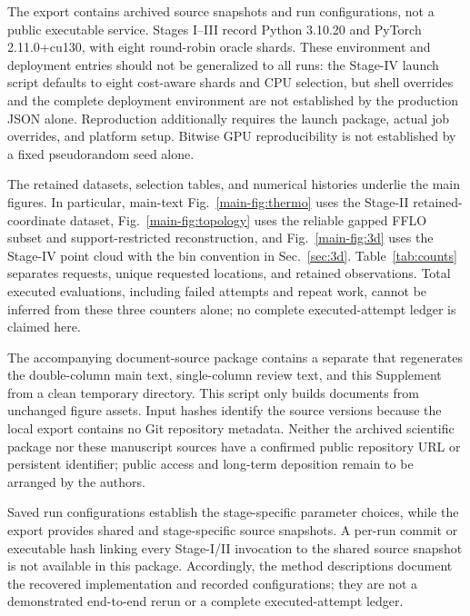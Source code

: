 The export contains archived source snapshots and run configurations, not a public executable service. Stages I--III record Python 3.10.20 and PyTorch 2.11.0+cu130, with eight round-robin oracle shards. These environment and deployment entries should not be generalized to all runs: the Stage-IV launch script defaults to eight cost-aware shards and CPU selection, but shell overrides and the complete deployment environment are not established by the production JSON alone. Reproduction additionally requires the launch package, actual job overrides, and platform setup. Bitwise GPU reproducibility is not established by a fixed pseudorandom seed alone.

The retained datasets, selection tables, and numerical histories underlie the main figures. In particular, main-text Fig.~\ref{main-fig:thermo} uses the Stage-II retained-coordinate dataset, Fig.~\ref{main-fig:topology} uses the reliable gapped FFLO subset and support-restricted reconstruction, and Fig.~\ref{main-fig:3d} uses the Stage-IV point cloud with the bin convention in Sec.~\ref{sec:3d}. Table~\ref{tab:counts} separates requests, unique requested locations, and retained observations. Total executed evaluations, including failed attempts and repeat work, cannot be inferred from these three counters alone; no complete executed-attempt ledger is claimed here.

The accompanying document-source package contains a separate  that regenerates the double-column main text, single-column review text, and this Supplement from a clean temporary directory. This script only builds documents from unchanged figure assets. Input hashes identify the source versions because the local export contains no Git repository metadata. Neither the archived scientific package nor these manuscript sources have a confirmed public repository URL or persistent identifier; public access and long-term deposition remain to be arranged by the authors.

Saved run configurations establish the stage-specific parameter choices, while the export provides shared and stage-specific source snapshots. A per-run commit or executable hash linking every Stage-I/II invocation to the shared source snapshot is not available in this package. Accordingly, the method descriptions document the recovered implementation and recorded configurations; they are not a demonstrated end-to-end rerun or a complete executed-attempt ledger.
